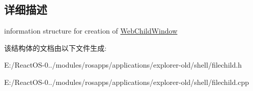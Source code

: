 \subsection{详细描述}
information structure for creation of \hyperlink{struct_web_child_window}{Web\+Child\+Window} 

该结构体的文档由以下文件生成\+:\begin{DoxyCompactItemize}
\item 
E\+:/\+React\+O\+S-\/0../modules/rosapps/applications/explorer-\/old/shell/filechild.\+h\item 
E\+:/\+React\+O\+S-\/0../modules/rosapps/applications/explorer-\/old/shell/filechild.\+cpp\end{DoxyCompactItemize}
